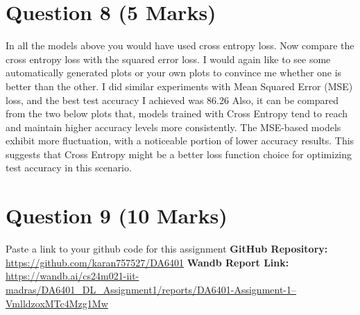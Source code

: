 \documentclass{article}
\begin{document}
{{\section{Question 8 (5 Marks)}
In all the models above you would have used cross entropy loss. Now compare the cross entropy loss with the squared error loss. I would again like to see some automatically generated plots or your own plots to convince me whether one is better than the other.
I did similar experiments with Mean Squared Error (MSE) loss, and the best test accuracy I achieved was 86.26%
Also, it can be compared from the two below plots that, models trained with Cross Entropy tend to reach and maintain higher accuracy levels more consistently. The MSE-based models exhibit more fluctuation, with a noticeable portion of lower accuracy results. This suggests that Cross Entropy might be a better loss function choice for optimizing test accuracy in this scenario.
\section{Question 9 (10 Marks)}
Paste a link to your github code for this assignment
\textbf{GitHub Repository: }\href{https://github.com/karan757527/DA6401}{https://github.com/karan757527/DA6401}
\textbf{Wandb Report Link: }\href{https://wandb.ai/cs24m021-iit-madras/DA6401_DL_Assignment1/reports/DA6401-Assignment-1--VmlldzoxMTc4Mzg1Mw/edit?draftId=VmlldzoxMTc5OTY4MA==}{https://wandb.ai/cs24m021-iit-madras/DA6401_DL_Assignment1/reports/DA6401-Assignment-1--VmlldzoxMTc4Mzg1Mw}
}}
\end{document}
